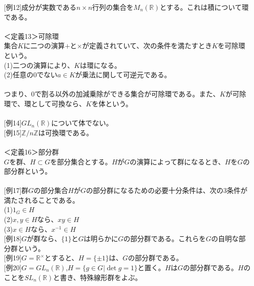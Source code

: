 \documentclass{jsarticle}
\begin{document}
\hspace{5mm}[例12]成分が実数である\(n\times n\)行列の集合を\(M_{n}(\mathbb{R})\)とする。これは積について環である。\\
\\
＜定義13＞可除環\\
集合\(K\)に二つの演算\(+\)と\(\times\)が定義されていて、次の条件を満たすとき\(K\)を可除環という。\\
(1)二つの演算により、\(K\)は環になる。\\
(2)任意の0でない\(a\in K\)が乗法に関して可逆元である。\\
\\
つまり、0で割る以外の加減乗除ができる集合が可除環である。また、\(K\)が可除環で、環として可換なら、\(K\)を体という。\\
\\
\hspace{5mm}[例14]\(GL_{n}(\mathbb{R})\)について体でない。\\
\hspace{5mm}[例15]\(\mathbb{Z}/n\mathbb{Z}\)は可換環である。\\
\\
＜定義16＞部分群\\
\(G\)を群、\(H\subset G\)を部分集合とする。\(H\)が\(G\)の演算によって群になるとき、\(H\)を\(G\)の部分群という。\\
\\
\hspace{5mm}[例17]群\(G\)の部分集合\(H\)が\(G\)の部分群になるための必要十分条件は、次の3条件が満たされることである。\\
\hspace{5mm}(1)\(1_{G}\in H\)\\
\hspace{5mm}(2)\(x,y\in H\)なら、\(xy\in H\)\\
\hspace{5mm}(3)\(x\in H\)なら、\(x^{-1}\in H\)\\
\hspace{5mm}[例18]\(G\)が群なら、\(\{1\}\)と\(G\)は明らかに\(G\)の部分群である。これらを\(G\)の自明な部分群という。\\
\hspace{5mm}[例19]\(G=\mathbb{R}^{\times}\)とすると、\(H=\{\pm1\}\)は、\(G\)の部分群である。\\
\hspace{5mm}[例20]\(G=GL_{n}(\mathbb{R})\),\(H=\{g\in G|\det g=1\}\)と置く。\(H\)は\(G\)の部分群である。\(H\)のことを\(SL_{n}(\mathbb{R})\)と書き、特殊線形群をよぶ。\\
\end{document}
